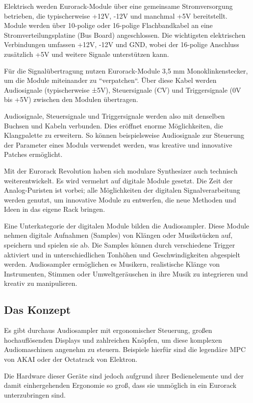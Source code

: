 	Elektrisch werden Eurorack-Module über eine gemeinsame Stromversorgung betrieben, die typischerweise +12V, -12V und manchmal +5V bereitstellt. Module werden über 10-polige oder 16-polige Flachbandkabel an eine Stromverteilungsplatine (Bus Board) angeschlossen. Die wichtigsten elektrischen Verbindungen umfassen +12V, -12V und GND, wobei der 16-polige Anschluss zusätzlich +5V und weitere Signale unterstützen kann. \cite{eurorack-standard}
	
	Für die Signalübertragung nutzen Eurorack-Module 3,5 mm Monoklinkenstecker, um die Module miteinander zu ``verpatchen``. Über diese Kabel werden Audiosignale (typischerweise ±5V), Steuersignale (CV) und Triggersignale (0V bis +5V) zwischen den Modulen übertragen.
	
	Audiosignale, Steuersignale und Triggersignale werden also mit denselben Buchsen und Kabeln verbunden.
	Dies eröffnet enorme Möglichkeiten, die Klangpalette zu erweitern. So können beispielsweise Audiosignale zur Steuerung der Parameter eines Moduls verwendet werden, was kreative und innovative Patches ermöglicht.
	
	Mit der Eurorack Revolution haben sich modulare Synthesizer auch technisch weiterentwickelt. 
	Es wird vermehrt auf digitale Module gesetzt. 
	Die Zeit der Analog-Puristen ist vorbei; alle Möglichkeiten der digitalen Signalverarbeitung werden genutzt, um innovative Module zu entwerfen, die neue Methoden und Ideen in das eigene Rack bringen.
	
	Eine Unterkategorie der digitalen Module bilden die Audiosampler. Diese Module nehmen digitale Aufnahmen (Samples) von Klängen oder Musikstücken auf, speichern und spielen sie ab. Die Samples können durch verschiedene Trigger aktiviert und in unterschiedlichen Tonhöhen und Geschwindigkeiten abgespielt werden. 
	Audiosampler ermöglichen es Musikern, realistische Klänge von Instrumenten, Stimmen oder Umweltgeräuschen in ihre Musik zu integrieren und kreativ zu manipulieren.
	
	\subsection{Das Konzept}
	
	Es gibt durchaus Audiosampler mit ergonomischer Steuerung, großen hochauflösenden Displays und zahlreichen Knöpfen, um diese komplexen Audiomaschinen angenehm zu steuern. 
	Beispiele hierfür sind die legendäre MPC von AKAI oder der Octatrack von Elektron. 
	
	Die Hardware dieser Geräte sind jedoch aufgrund ihrer Bedienelemente und der damit einhergehenden Ergonomie so groß, dass sie unmöglich in ein Eurorack unterzubringen sind.
	
